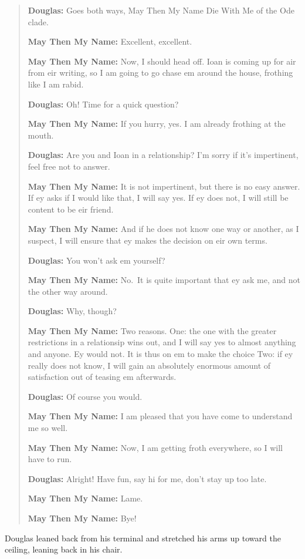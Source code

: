 \begin{quote}
\textbf{Douglas:} Goes both ways, May Then My Name Die With Me of the Ode clade.

\textbf{May Then My Name:} Excellent, excellent.

\textbf{May Then My Name:} Now, I should head off. Ioan is coming up for air from eir writing, so I am going to go chase em around the house, frothing like I am rabid.

\textbf{Douglas:} Oh! Time for a quick question?

\textbf{May Then My Name:} If you hurry, yes. I am already frothing at the mouth.

\textbf{Douglas:} Are you and Ioan in a relationship? I'm sorry if it's impertinent, feel free not to answer.

\textbf{May Then My Name:} It is not impertinent, but there is no easy answer. If ey asks if I would like that, I will say yes. If ey does not, I will still be content to be eir friend.

\textbf{May Then My Name:} And if he does not know one way or another, as I suspect, I will ensure that ey makes the decision on eir own terms.

\textbf{Douglas:} You won't ask em yourself?

\textbf{May Then My Name:} No.~It is quite important that ey ask me, and not the other way around.

\textbf{Douglas:} Why, though?

\textbf{May Then My Name:} Two reasons. One: the one with the greater restrictions in a relationsip wins out, and I will say yes to almost anything and anyone. Ey would not. It is thus on em to make the choice Two: if ey really does not know, I will gain an absolutely enormous amount of satisfaction out of teasing em afterwards.

\textbf{Douglas:} Of course you would.

\textbf{May Then My Name:} I am pleased that you have come to understand me so well.

\textbf{May Then My Name:} Now, I am getting froth everywhere, so I will have to run.

\textbf{Douglas:} Alright! Have fun, say hi for me, don't stay up too late.

\textbf{May Then My Name:} Lame.

\textbf{May Then My Name:} Bye!
\end{quote}

\noindent Douglas leaned back from his terminal and stretched his arms up toward the ceiling, leaning back in his chair.

